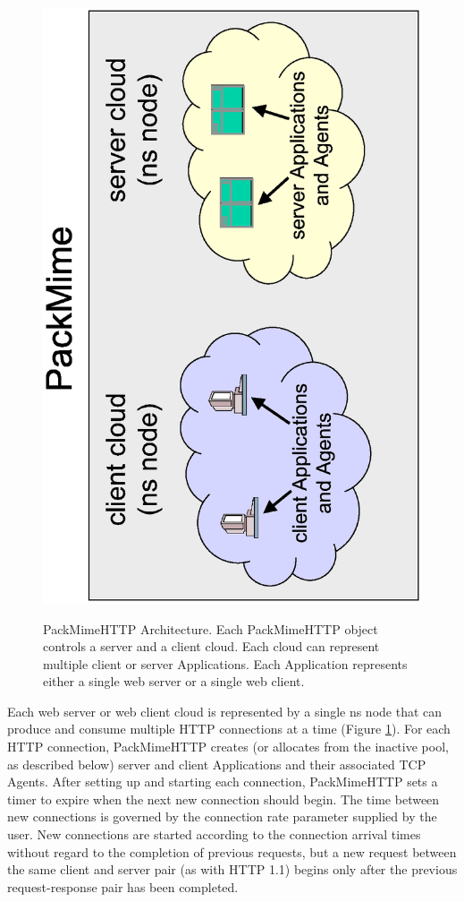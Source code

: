 \begin{figure}
\centering
\includegraphics[scale=0.5, angle=270]{figures/packmime.eps}
\label{fig-pm}
\caption{PackMimeHTTP Architecture. Each PackMimeHTTP object controls
a server and a client cloud. Each cloud can represent multiple client
or server Applications. Each Application represents either a single
web server or a single web client.} 
\end{figure}  

Each web server or web client cloud is represented by a single ns node
that can produce and consume multiple HTTP connections at a time
(Figure \ref{fig-pm}). For each HTTP connection, PackMimeHTTP creates (or
allocates from the inactive pool, as described below) server and
client Applications and their associated TCP Agents. After setting up
and starting each connection, PackMimeHTTP sets a timer to expire when
the next new connection should begin. The time between new connections
is governed by the connection rate parameter supplied by the user. New
connections are started according to the connection arrival times
without regard to the completion of previous requests, but a new
request between the same client and server pair (as with HTTP 1.1)
begins only after the previous request-response pair has been
completed. 

